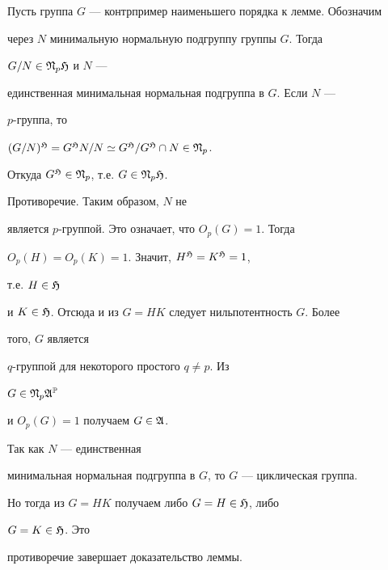 \begin{pf}


Пусть группа $G$ --- контрпример наименьшего порядка к лемме. Обозначим


через $N$ минимальную нормальную подгруппу группы $G$. Тогда


$G/N\in\frak N_p\frak H$ и $N$ ---


единственная минимальная нормальная подгруппа в $G$. Если $N$ ---


$p$-группа, то


$(G/N)^{\frak H}=G^{\frak H}N/N\simeq G^{\frak H}/G^{\frak H}


\cap N\in\frak N_p$.


Откуда $G^{\frak H}\in\frak N_p$, т.е. $G\in\frak N_p\frak H$.


Противоречие. Таким образом, $N$ не


является $p$-группой. Это означает, что $O_p(G)=1$. Тогда


$O_p(H)=O_p(K)=1$. Значит, $H^{\frak H}=K^{\frak H}=1$,


т.е. $H\in\frak H$


и $K\in\frak H$. Отсюда и из $G=HK$ следует нильпотентность $G$. Более


того, $G$ является


$q$-группой для некоторого простого $q\ne p$. Из


$G\in\frak N_p\frak A^{\Bbb P}$


и $O_p(G)=1$ получаем $G\in\frak A$.


Так как $N$ --- единственная


минимальная нормальная подгруппа в $G$, то $G$ --- циклическая группа.


Но тогда из $G=HK$ получаем либо $G=H\in\frak H$, либо


$G=K\in\frak H$. Это


противоречие завершает доказательство леммы.


\end{pf}





